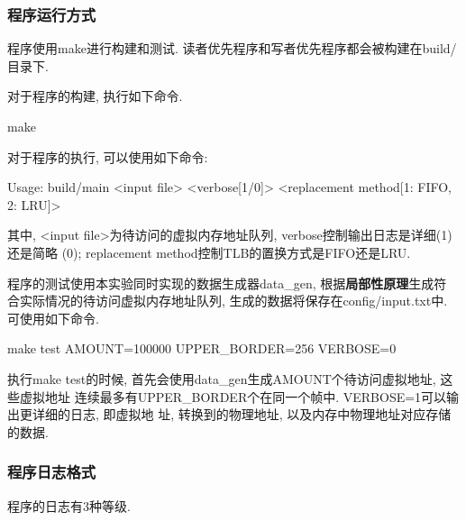 \subsubsection{程序运行方式}
程序使用make进行构建和测试. 读者优先程序和写者优先程序都会被构建在build/目录下.\par
对于程序的构建, 执行如下命令.
\begin{code}
    make
\end{code}

对于程序的执行, 可以使用如下命令:
\begin{code}
    Usage: build/main <input file> <verbose[1/0]> <replacement method[1: FIFO, 2: LRU]>
\end{code}

其中, <input file>为待访问的虚拟内存地址队列, verbose控制输出日志是详细(1)还是简略
(0); replacement method控制TLB的置换方式是FIFO还是LRU.\par

程序的测试使用本实验同时实现的数据生成器data\_gen, 根据\textbf{局部性原理}生成符
合实际情况的待访问虚拟内存地址队列, 生成的数据将保存在config/input.txt中. 可使用如下命令.

\begin{code}
    make test AMOUNT=100000 UPPER_BORDER=256 VERBOSE=0
\end{code}

执行make test的时候, 首先会使用data\_gen生成AMOUNT个待访问虚拟地址, 这些虚拟地址
连续最多有UPPER\_BORDER个在同一个帧中. VERBOSE=1可以输出更详细的日志, 即虚拟地
址, 转换到的物理地址, 以及内存中物理地址对应存储的数据.

\subsubsection{程序日志格式}
程序的日志有3种等级.\par

